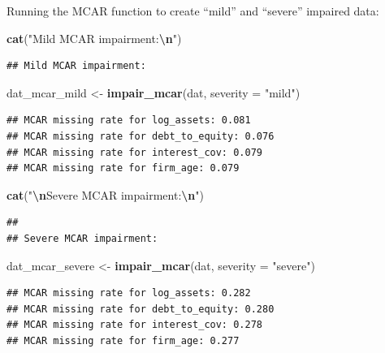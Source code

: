 \documentclass[
]{article}
\newenvironment{Shaded}{\begin{snugshade}}{\end{snugshade}}
\newcommand{\AttributeTok}[1]{\textcolor[rgb]{0.13,0.29,0.53}{#1}}
\newcommand{\FunctionTok}[1]{\textcolor[rgb]{0.13,0.29,0.53}{\textbf{#1}}}
\newcommand{\NormalTok}[1]{#1}
\newcommand{\OtherTok}[1]{\textcolor[rgb]{0.56,0.35,0.01}{#1}}
\newcommand{\SpecialCharTok}[1]{\textcolor[rgb]{0.81,0.36,0.00}{\textbf{#1}}}
\newcommand{\StringTok}[1]{\textcolor[rgb]{0.31,0.60,0.02}{#1}}
\begin{document}
Running the MCAR function to create ``mild'' and ``severe'' impaired
data:

\begin{Shaded}
\begin{Highlighting}[]
\FunctionTok{cat}\NormalTok{(}\StringTok{"Mild MCAR impairment:}\SpecialCharTok{\textbackslash{}n}\StringTok{"}\NormalTok{)}
\end{Highlighting}
\end{Shaded}

\begin{verbatim}
## Mild MCAR impairment:
\end{verbatim}

\begin{Shaded}
\begin{Highlighting}[]
\NormalTok{dat\_mcar\_mild   }\OtherTok{\textless{}{-}} \FunctionTok{impair\_mcar}\NormalTok{(dat, }\AttributeTok{severity =} \StringTok{"mild"}\NormalTok{)}
\end{Highlighting}
\end{Shaded}

\begin{verbatim}
## MCAR missing rate for log_assets: 0.081
## MCAR missing rate for debt_to_equity: 0.076
## MCAR missing rate for interest_cov: 0.079
## MCAR missing rate for firm_age: 0.079
\end{verbatim}

\begin{Shaded}
\begin{Highlighting}[]
\FunctionTok{cat}\NormalTok{(}\StringTok{"}\SpecialCharTok{\textbackslash{}n}\StringTok{Severe MCAR impairment:}\SpecialCharTok{\textbackslash{}n}\StringTok{"}\NormalTok{)}
\end{Highlighting}
\end{Shaded}

\begin{verbatim}
## 
## Severe MCAR impairment:
\end{verbatim}

\begin{Shaded}
\begin{Highlighting}[]
\NormalTok{dat\_mcar\_severe }\OtherTok{\textless{}{-}} \FunctionTok{impair\_mcar}\NormalTok{(dat, }\AttributeTok{severity =} \StringTok{"severe"}\NormalTok{)}
\end{Highlighting}
\end{Shaded}

\begin{verbatim}
## MCAR missing rate for log_assets: 0.282
## MCAR missing rate for debt_to_equity: 0.280
## MCAR missing rate for interest_cov: 0.278
## MCAR missing rate for firm_age: 0.277
\end{verbatim}
\end{document}
